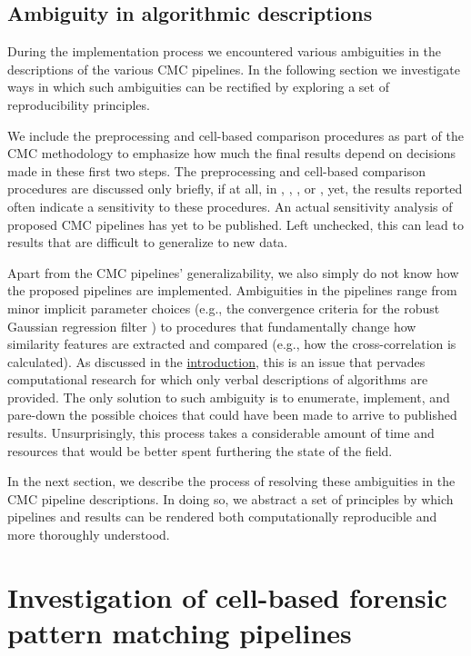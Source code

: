 \hypertarget{ambiguities}{%
\subsection{Ambiguity in algorithmic descriptions}\label{ambiguities}}

During the implementation process we encountered various ambiguities in
the descriptions of the various CMC pipelines. In the following section
we investigate ways in which such ambiguities can be rectified by
exploring a set of reproducibility principles.

We include the preprocessing and cell-based comparison procedures as
part of the CMC methodology to emphasize how much the final results
depend on decisions made in these first two steps. The preprocessing and
cell-based comparison procedures are discussed only briefly, if at all,
in \citet{song_3d_2014}, \citet{tong_fired_2014},
\citet{tong_improved_2015}, or \citet{chen_convergence_2017}, yet, the
results reported often indicate a sensitivity to these procedures. An
actual sensitivity analysis of proposed CMC pipelines has yet to be
published. Left unchecked, this can lead to results that are difficult
to generalize to new data.

Apart from the CMC pipelines' generalizability, we also simply do not
know how the proposed pipelines are implemented. Ambiguities in the
pipelines range from minor implicit parameter choices (e.g., the
convergence criteria for the robust Gaussian regression filter
\citep{brinkman_bodschwinna_2003}) to procedures that fundamentally
change how similarity features are extracted and compared (e.g., how the
cross-correlation is calculated). As discussed in the
\protect\hyperlink{intro}{introduction}, this is an issue that pervades
computational research for which only verbal descriptions of algorithms
are provided. The only solution to such ambiguity is to enumerate,
implement, and pare-down the possible choices that could have been made
to arrive to published results. Unsurprisingly, this process takes a
considerable amount of time and resources that would be better spent
furthering the state of the field.

In the next section, we describe the process of resolving these
ambiguities in the CMC pipeline descriptions. In doing so, we abstract a
set of principles by which pipelines and results can be rendered both
computationally reproducible and more thoroughly understood.

\hypertarget{investigation}{%
\section{Investigation of cell-based forensic pattern matching
pipelines}\label{investigation}}

